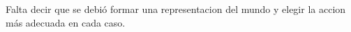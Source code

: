 Falta decir que se debió formar una representacion del mundo y elegir la accion más adecuada en cada caso.       
    




